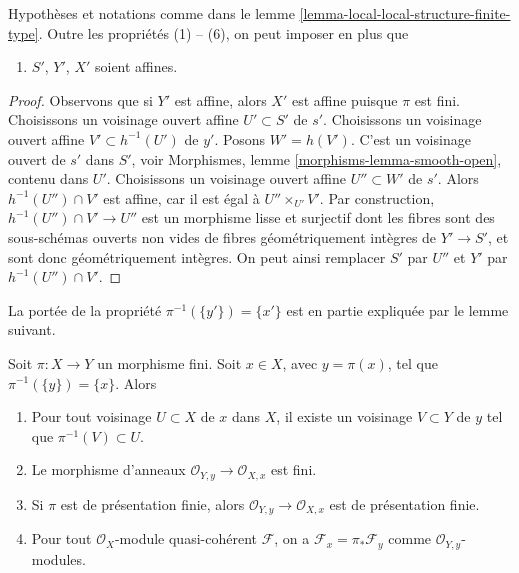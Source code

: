 \begin{lemma}
\label{lemma-local-local-structure-finite-type-affine}
Hypothèses et notations comme dans le
lemme \ref{lemma-local-local-structure-finite-type}.
Outre les propriétés (1) -- (6), on peut imposer en plus que
\begin{enumerate}
\item[(7)] $S'$, $Y'$, $X'$ soient affines.
\end{enumerate}
\end{lemma}

\begin{proof}
Observons que si $Y'$ est affine, alors $X'$ est affine puisque $\pi$ est fini.
Choisissons un voisinage ouvert affine $U' \subset S'$ de $s'$.
Choisissons un voisinage ouvert affine $V' \subset h^{-1}(U')$ de $y'$.
Posons $W' = h(V')$. C'est un voisinage ouvert de $s'$ dans $S'$, voir
Morphismes, lemme \ref{morphisms-lemma-smooth-open},
contenu dans $U'$. Choisissons un voisinage ouvert affine $U'' \subset W'$
de $s'$. Alors $h^{-1}(U'') \cap V'$ est affine, car il est égal à
$U'' \times_{U'} V'$. Par construction,
$h^{-1}(U'') \cap V' \to U''$ est un morphisme lisse et surjectif dont les
fibres sont des sous-schémas ouverts non vides de fibres géométriquement intègres
de $Y' \to S'$, et sont donc géométriquement intègres. On peut ainsi remplacer
$S'$ par $U''$ et $Y'$ par $h^{-1}(U'') \cap V'$.
\end{proof}

\noindent
La portée de la propriété $\pi^{-1}(\{y'\}) = \{x'\}$ est en partie
expliquée par le lemme suivant.

\begin{lemma}
\label{lemma-finite-morphism-single-point-in-fibre}
Soit $\pi : X \to Y$ un morphisme fini.
Soit $x \in X$, avec $y = \pi(x)$, tel que $\pi^{-1}(\{y\}) = \{x\}$.
Alors
\begin{enumerate}
\item Pour tout voisinage $U \subset X$ de $x$ dans $X$, il
existe un voisinage $V \subset Y$ de $y$ tel que
$\pi^{-1}(V) \subset U$.
\item Le morphisme d'anneaux $\mathcal{O}_{Y, y} \to \mathcal{O}_{X, x}$
est fini.
\item Si $\pi$ est de présentation finie, alors
$\mathcal{O}_{Y, y} \to \mathcal{O}_{X, x}$ est de présentation finie.
\item Pour tout $\mathcal{O}_X$-module quasi-cohérent $\mathcal{F}$,
on a $\mathcal{F}_x = \pi_*\mathcal{F}_y$ comme
$\mathcal{O}_{Y, y}$-modules.
\end{enumerate}
\end{lemma}

